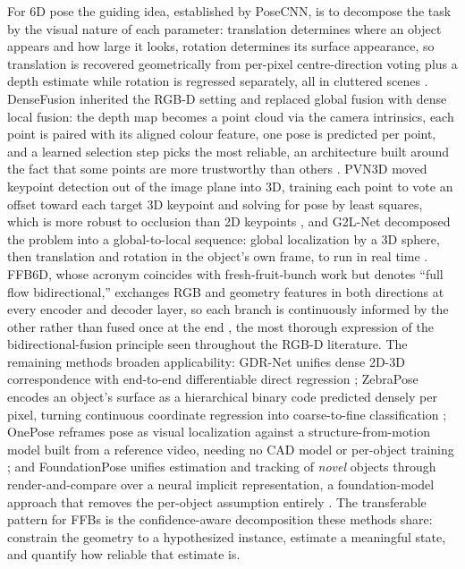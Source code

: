 For 6D pose the guiding idea, established by PoseCNN, is to decompose the task by the visual nature of each parameter: translation determines where an object appears and how large it looks, rotation determines its surface appearance, so translation is recovered geometrically from per-pixel centre-direction voting plus a depth estimate while rotation is regressed separately, all in cluttered scenes \cite{xiang2018posecnn}. DenseFusion inherited the RGB-D setting and replaced global fusion with dense local fusion: the depth map becomes a point cloud via the camera intrinsics, each point is paired with its aligned colour feature, one pose is predicted per point, and a learned selection step picks the most reliable, an architecture built around the fact that some points are more trustworthy than others \cite{wang2019densefusion}. PVN3D moved keypoint detection out of the image plane into 3D, training each point to vote an offset toward each target 3D keypoint and solving for pose by least squares, which is more robust to occlusion than 2D keypoints \cite{he2020pvn3d}, and G2L-Net decomposed the problem into a global-to-local sequence: global localization by a 3D sphere, then translation and rotation in the object's own frame, to run in real time \cite{chen2020g2lnet}. FFB6D, whose acronym coincides with fresh-fruit-bunch work but denotes ``full flow bidirectional,'' exchanges RGB and geometry features in both directions at every encoder and decoder layer, so each branch is continuously informed by the other rather than fused once at the end \cite{he2021ffb6d}, the most thorough expression of the bidirectional-fusion principle seen throughout the RGB-D literature. The remaining methods broaden applicability: GDR-Net unifies dense 2D-3D correspondence with end-to-end differentiable direct regression \cite{wang2021gdrnet}; ZebraPose encodes an object's surface as a hierarchical binary code predicted densely per pixel, turning continuous coordinate regression into coarse-to-fine classification \cite{su2022zebrapose}; OnePose reframes pose as visual localization against a structure-from-motion model built from a reference video, needing no CAD model or per-object training \cite{sun2022onepose}; and FoundationPose unifies estimation and tracking of \emph{novel} objects through render-and-compare over a neural implicit representation, a foundation-model approach that removes the per-object assumption entirely \cite{wen2024foundationpose}. The transferable pattern for FFBs is the confidence-aware decomposition these methods share: constrain the geometry to a hypothesized instance, estimate a meaningful state, and quantify how reliable that estimate is.

